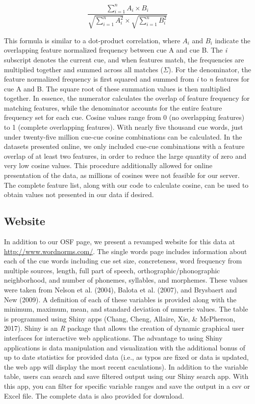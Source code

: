 \documentclass[english,man]{apa6}
\theoremstyle{definition}
\theoremstyle{definition}
\theoremstyle{definition}
\theoremstyle{remark}
\begin{document}
\[
\frac{\sum_{i=1}^{n} A_i \times B_i} {\sqrt{\sum_{i=1}^{n} A_i^2} \times \sqrt{\sum_{i=1}^{n} B_i^2}}
\]

This formula is similar to a dot-product correlation, where \(A_i\) and
\(B_i\) indicate the overlapping feature normalized frequency between
cue A and cue B. The \emph{i} subscript denotes the current cue, and
when features match, the frequencies are multiplied together and summed
across all matches (\(\Sigma\)). For the denominator, the feature
normalized frequency is first squared and summed from \emph{i} to
\emph{n} features for cue A and B. The square root of these summation
values is then multiplied together. In essence, the numerator calculates
the overlap of feature frequency for matching features, while the
denominator accounts for the entire feature frequency set for each cue.
Cosine values range from 0 (no overlapping features) to 1 (complete
overlapping features). With nearly five thousand cue words, just under
twenty-five million cue-cue cosine combinations can be calculated. In
the datasets presented online, we only included cue-cue combinations
with a feature overlap of at least two features, in order to reduce the
large quantity of zero and very low cosine values. This procedure
additionally allowed for online presentation of the data, as millions of
cosines were not feasible for our server. The complete feature list,
along with our code to calculate cosine, can be used to obtain values
not presented in our data if desired.

\subsection{Website}\label{website}

In addition to our OSF page, we present a revamped website for this data
at \url{http://www.wordnorms.com/}. The single words page includes
information about each of the cue words including cue set size,
concreteness, word frequency from multiple sources, length, full part of
speech, orthographic/phonographic neighborhood, and number of phonemes,
syllables, and morphemes. These values were taken from Nelson et al.
(2004), Balota et al. (2007), and Brysbaert and New (2009). A definition
of each of these variables is provided along with the minimum, maximum,
mean, and standard deviation of numeric values. The table is programmed
using Shiny apps (Chang, Cheng, Allaire, Xie, \& McPherson, 2017). Shiny
is an \emph{R} package that allows the creation of dynamic graphical
user interfaces for interactive web applications. The advantage to using
Shiny applications is data manipulation and visualization with the
additional bonus of up to date statistics for provided data (i.e., as
typos are fixed or data is updated, the web app will display the most
recent caculations). In addition to the variable table, users can search
and save filtered output using our Shiny search app. With this app, you
can filter for specific variable ranges and save the output in a csv or
Excel file. The complete data is also provided for download.
\end{document}
